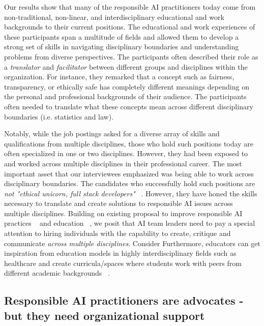 \documentclass[sigconf]{acmart}
\begin{document}
Our results show that many of the responsible AI practitioners today come from non-traditional, non-linear, and interdisciplinary educational and work backgrounds to their current positions. The educational and work experiences of these participants span a multitude of fields and allowed them to develop a strong set of skills in navigating disciplinary boundaries and understanding problems from diverse perspectives. The participants often described their role as a \textit{translator} and \textit{facilitator} between different groups and disciplines within the organization. For instance, they remarked that a concept such as fairness, transparency, or ethically safe has completely different meanings depending on the personal and professional backgrounds of their audience. The participants often needed to translate what these concepts mean across different disciplinary boundaries (i.e. statistics and law).

Notably, while the job postings asked for a diverse array of skills and qualifications from multiple disciplines, those who hold such positions today are often specialized in one or two disciplines. However, they had been exposed to and worked across multiple disciplines in their professional career. The most important asset that our interviewees emphasized was being able to work across disciplinary boundaries. The candidates who successfully hold such positions are\textit{ not "ethical unicorn, full stack developers"} ~\cite{Raji2021}. However, they have honed the skills necessary to translate and create solutions to responsible AI issues across multiple disciplines. Building on existing proposal to improve responsible AI practices ~\cite{Madaio2020,Rismani2023-im,Costanza-Chock2022-ch} and education ~\cite{Garrett2020-dw,Peterson2023-xa}, we posit that AI team leaders need to pay a special attention to hiring individuals with the capability to create, critique and communicate \textit{across multiple disciplines}. Consider Furthermore, educators can get inspiration from education models in highly interdisciplinary fields such as healthcare and create curricula/spaces where students work with peers from different academic backgrounds ~\cite{Klaassen2018-tk,Dyer2003-bd,Hall2001-rg}. 



\subsection{Responsible AI practitioners are advocates - but they need organizational support}
\end{document}

